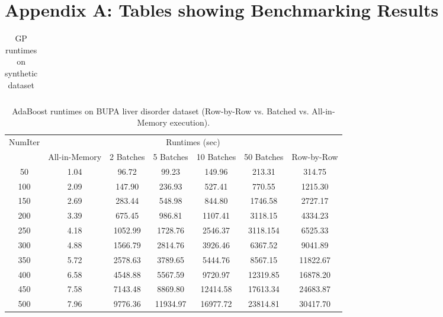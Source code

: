 \section*{Appendix A: Tables showing Benchmarking Results}

\begin{table}[!htbp]
\centering
\begin{tabular}{lcc}
\end{tabular}
\caption{GP runtimes on synthetic dataset}
\label{tab:gp}
\end{table}

\begin{table}[!htbp]
\small
\centering
\begin{tabular}{|c|c|c|c|c|c|c|}
\hline
\multirow{2}{*}{NumIter} & \multicolumn{6}{|c|}{Runtimes (sec)}\\
\cline{2-7}
& All-in-Memory & 2 Batches & 5 Batches & 10 Batches & 50 Batches & Row-by-Row\\
\hline
50 &1.04 &96.72 &99.23 &149.96 &213.31 &314.75 \\
\hline
100 &2.09 &147.90 &236.93 &527.41 &770.55 &1215.30 \\
\hline
150 &2.69 &283.44 &548.98 &844.80 &1746.58 &2727.17 \\ 
\hline
200 &3.39 &675.45 &986.81 &1107.41 &3118.15 &4334.23 \\ 
\hline
250 &4.18 &1052.99 &1728.76 &2546.37 &3118.154 &6525.33 \\ 
\hline
300 &4.88 &1566.79 &2814.76 &3926.46 &6367.52 &9041.89 \\ 
\hline
350 &5.72 &2578.63 &3789.65 &5444.76 &8567.15 &11822.67 \\ 
\hline
400 &6.58 &4548.88 &5567.59 &9720.97 &12319.85 &16878.20 \\ 
\hline
450 &7.58 &7143.48 &8869.80 &12414.58 &17613.34 &24683.87 \\ 
\hline
500 &7.96 &9776.36 &11934.97 &16977.72 &23814.81 &30417.70 \\
\hline
\end{tabular}
\caption{AdaBoost runtimes on BUPA liver disorder dataset (Row-by-Row vs. Batched vs. All-in-Memory execution).}
\label{tab:adaBupa1}
\end{table}

